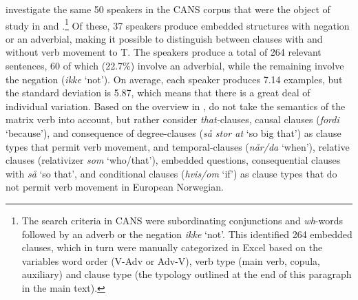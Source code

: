 \documentclass[output=paper]{langscibook}
\begin{document}
\citet{JensbergEtAl2024} investigate the same 50 speakers in the CANS corpus that were the object of study in \citet{WestergaardEtAl2021} and \citet{LundquistEtAl2020}.\footnote{The search criteria in CANS were subordinating conjunctions and \textit{wh}-words followed by an adverb or the negation \textit{ikke} ‘not’. This identified 264 embedded clauses, which in turn were manually categorized in Excel based on the variables word order (V-Adv or Adv-V), verb type (main verb, copula, auxiliary) and clause type (the typology outlined at the end of this paragraph in the main text).} Of these, 37 speakers produce embedded structures with negation or an adverbial, making it possible to distinguish between clauses with and without verb movement to T. The speakers produce a total of 264 relevant sentences, 60 of which (22.7\%) involve an adverbial, while the remaining involve the negation (\textit{ikke} ‘not’). On average, each speaker produces 7.14 examples, but the standard deviation is 5.87, which means that there is a great deal of individual variation. Based on the overview in \citet{Ringstad2019}, \citet{JensbergEtAl2024} do not take the semantics of the matrix verb into account, but rather consider \textit{that-}clauses, causal clauses (\textit{fordi} ‘because’), and consequence of degree-clauses (\textit{så stor at} ‘so big that’) as clause types that permit verb movement, and temporal-clauses (\textit{når/da} ‘when’), relative clauses (relativizer \textit{som} ‘who/that’), embedded questions, consequential clauses with \textit{så} ‘so that’, and conditional clauses (\textit{hvis/om} ‘if’) as clause types that do not permit verb movement in European Norwegian.
\end{document}
